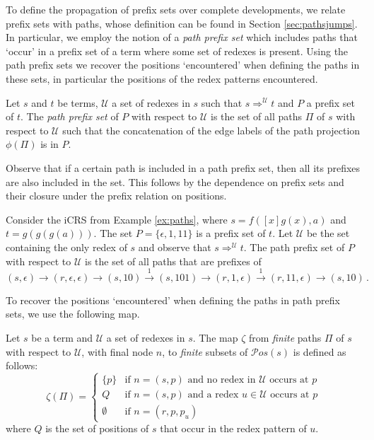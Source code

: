 \documentclass{LMCS}
\theoremstyle{definition}
\newcommand{\rew}{\rightarrow}
\newcommand{\pos}[1]{\mathcal{P}os(#1)}
\newcommand{\redpos}[1]{p_{#1}}
\newcommand{\apath}{\Pi}
\newcommand{\dev}{\Rightarrow}
\begin{document}
To define the propagation of prefix sets over complete developments, we relate prefix sets with paths, whose definition can be found in Section \ref{sec:pathsjumps}. In particular, we employ the notion of a \emph{path prefix set} which includes paths that `occur' in a prefix set of a term where some set of redexes is present. Using the path prefix sets we recover the positions `encountered' when defining the paths in these sets, in particular the positions of the redex patterns encountered.

\begin{defi}
Let $s$ and $t$ be terms, $\mathcal{U}$ a set of redexes in $s$ such that $s \dev^\mathcal{U} t$ and $P$ a prefix set of $t$. The \emph{path prefix set} of $P$ with respect to $\mathcal{U}$ is the set of all paths $\apath$ of $s$ with respect to $\mathcal{U}$ such that the concatenation of the edge labels of the path projection $\phi(\apath)$ is in $P$.
\end{defi}

Observe that if a certain path is included in a path prefix set, then all its prefixes are also included in the set. This follows by the dependence on prefix sets and their closure under the prefix relation on positions.

\begin{exa}
\label{ex:path_prefixes}
Consider the iCRS from Example \ref{ex:paths}, where
$s = f([x]g(x),a)$ and $t = g(g(g(a)))$.
The set $P = \{ \epsilon, 1, 11 \}$ is a prefix set of $t$.
Let $\mathcal{U}$ be the set containing the only redex of $s$ and
observe that $s \dev^\mathcal{U} t$.
The path prefix set of $P$ with respect to $\mathcal{U}$ is the set of all paths
that are prefixes of
\[
(s,\epsilon) \rew (r,\epsilon,\epsilon) \rew (s,10)
\overset{1}{\rew} (s,101) \rew (r,1,\epsilon) \overset{1}{\rew}
(r,11,\epsilon) \rew (s,10) \, .
\]
\end{exa}

To recover the positions `encountered' when defining the paths in path prefix sets, we use the following map.

\begin{defi}
Let $s$ be a term and $\mathcal{U}$ a set of redexes in $s$. The map $\zeta$ from \emph{finite} paths $\apath$ of $s$ with respect to $\mathcal{U}$, with final node $n$, to \emph{finite} subsets of $\pos{s}$ is defined as follows:
\[
\zeta(\apath) =
\begin{cases}
\{ p \}   & \text{if $n = (s, p)$ and no redex
                  in $\mathcal{U}$ occurs at $p$} \\
Q         & \text{if $n = (s, p)$ and a redex $u \in \mathcal{U}$ occurs
                  at $p$} \\
\emptyset & \text{if $n = (r, p, \redpos{u})$}
\end{cases}
\]
where $Q$ is the set of positions of $s$ that occur in the redex pattern of $u$.
\end{defi}
\end{document}

